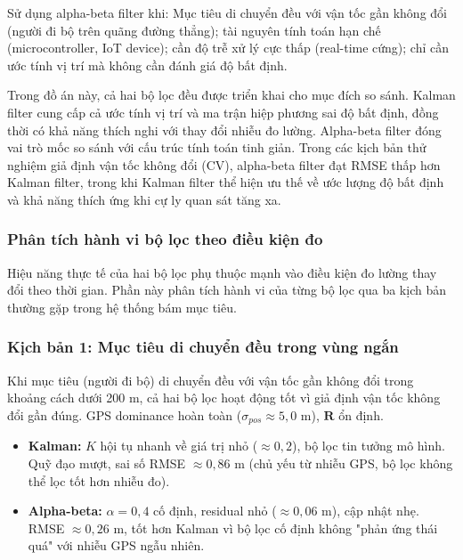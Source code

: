 Sử dụng alpha-beta filter khi: Mục tiêu di chuyển đều với vận tốc gần không đổi (người đi bộ trên quãng đường thẳng); tài nguyên tính toán hạn chế (microcontroller, IoT device); cần độ trễ xử lý cực thấp (real-time cứng); chỉ cần ước tính vị trí mà không cần đánh giá độ bất định.

Trong đồ án này, cả hai bộ lọc đều được triển khai cho mục đích so sánh. Kalman filter cung cấp cả ước tính vị trí và ma trận hiệp phương sai độ bất định, đồng thời có khả năng thích nghi với thay đổi nhiễu đo lường. Alpha-beta filter đóng vai trò mốc so sánh với cấu trúc tính toán tinh giản. Trong các kịch bản thử nghiệm giả định vận tốc không đổi (CV), alpha-beta filter đạt RMSE thấp hơn Kalman filter, trong khi Kalman filter thể hiện ưu thế về ước lượng độ bất định và khả năng thích ứng khi cự ly quan sát tăng xa.

\subsubsection{Phân tích hành vi bộ lọc theo điều kiện đo}

\hspace{0.5cm} Hiệu năng thực tế của hai bộ lọc phụ thuộc mạnh vào điều kiện đo lường thay đổi theo thời gian. Phần này phân tích hành vi của từng bộ lọc qua ba kịch bản thường gặp trong hệ thống bám mục tiêu.

\subsubsection{Kịch bản 1: Mục tiêu di chuyển đều trong vùng ngắn}

\hspace{0.5cm} Khi mục tiêu (người đi bộ) di chuyển đều với vận tốc gần không đổi trong khoảng cách dưới 200 m, cả hai bộ lọc hoạt động tốt vì giả định vận tốc không đổi gần đúng. GPS dominance hoàn toàn ($\sigma_{pos} \approx 5{,}0$ m), $\mathbf{R}$ ổn định.

\begin{itemize}
    \item \textbf{Kalman:} $K$ hội tụ nhanh về giá trị nhỏ ($\approx 0{,}2$), bộ lọc tin tưởng mô hình. Quỹ đạo mượt, sai số RMSE $\approx 0{,}86$ m (chủ yếu từ nhiễu GPS, bộ lọc không thể lọc tốt hơn nhiễu đo).
    \item \textbf{Alpha-beta:} $\alpha = 0{,}4$ cố định, residual nhỏ ($\approx 0{,}06$ m), cập nhật nhẹ. RMSE $\approx 0{,}26$ m, tốt hơn Kalman vì bộ lọc cố định không "phản ứng thái quá" với nhiễu GPS ngẫu nhiên.
\end{itemize}

